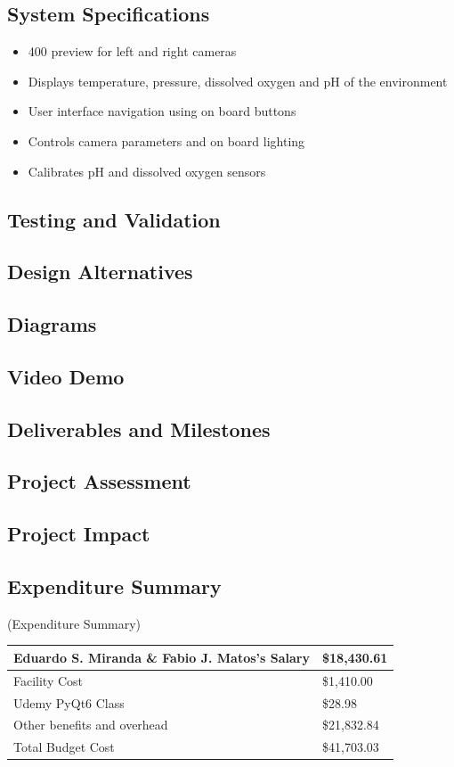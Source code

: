 \documentclass[17pt, aspectratio=169]{beamer}
\begin{document}
\subsection*{System Specifications}
\begin{itemize}
	\item 400 preview for left and right cameras
	\item Displays temperature, pressure, dissolved oxygen and pH of the environment
	\item User interface navigation using on board buttons
	\item Controls camera parameters and on board lighting
	\item Calibrates pH and dissolved oxygen sensors
\end{itemize}
\subsection*{Testing and Validation}
\subsection*{Design Alternatives}
\subsection*{Diagrams}
\subsection{Video Demo}
\subsection*{Deliverables and Milestones}
\subsection{Project Assessment}
\subsection*{Project Impact}
\subsection*{Expenditure Summary}
\begin{frame}(Expenditure Summary)
\begin{center}
	\begin{tabular}{||m{} | m{} ||}
		\hline
		Eduardo S. Miranda \& Fabio J. Matos's Salary                  & \$18,430.61 \\
		\hline
		Facility Cost                                                  & \$1,410.00   \\
		\hline
		Udemy PyQt6 Class & \$28.98    \\
		\hline
		Other benefits and overhead & \$21,832.84 \\
		\hline
		Total Budget Cost                                      & \$41,703.03  \\
		\hline
	\end{tabular}
	\end{center}
\end{frame}
\end{document}

